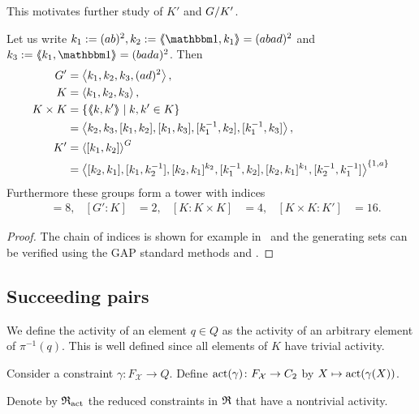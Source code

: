 \documentclass[a4paper,11pt]{amsart}
\begin{document}
This motivates further study of $K'$ and ${G/K'}$.
\begin{lem} \label{lem:subgroupsOfG}
Let us write $k_1 := (ab)^2, k_2:=\pair{\id,k_1} = (abad)^2$ and $k_3:=\pair{k_1,\id} = (bada)^2$. Then 
 \begin{align*}
  G' &= \left< k_1,k_2,k_3,(ad)^2\right>, \\
  K &= \left< k_1,k_2,k_3\right>, \\
  K\times K &= \{\langle\negthickspace\langle k,k'\rangle\negthickspace\rangle \mid k,k'\in K\} \\&= \left< k_2,k_3,[k_1,k_2],[k_1,k_3],[k_1^{-1},k_2],[k_1^{-1},k_3] \right>,\\
  K' &= \left< [k_1,k_2] \right>^G \\ 
  &= \left<[k_2,k_1],[k_1,k_2^{-1}],[k_2,k_1]^{k_2},[k_1^{-1},k_2], [k_2,k_1]^{k_1},[k_2^{-1},k_1^{-1}]\right>^{\{1,a\}} 
 \end{align*}
Furthermore these groups form a tower with indices
\begin{align*}
  [G:G']&=8, & [G':K]&=2, &[K:K\times K]&= 4, &[K\times K:K']&=16. 
\end{align*}
\end{lem}
\begin{proof}
 The chain of indices is shown for example in~\cite{Bartholdi-Grigorchuk-Sunik:BranchGroups} 
 and the generating sets can be verified using the GAP standard methods
  and . 
\end{proof}

\subsection{Succeeding pairs}
\begin{defi}
  We define the activity of an element $q\in Q$ as the activity of an
  arbitrary element of $\pi^{-1}(q)$.  This is well defined since
  all elements of $K$ have trivial activity.
 
  Consider a constraint $\gamma\colon F_{\mathcal{X}} \to Q$.  Define
  $\operatorname{act}(\gamma)\colon F_{\mathcal{X}}\to C_2$ by
  $X \mapsto \operatorname{act}(\gamma(X))$.
 
  Denote by $\mathfrak{R}_{\operatorname{act}}$ the reduced constraints in $\mathfrak{R}$ that have a
  nontrivial activity.
\end{defi}
\end{document}

